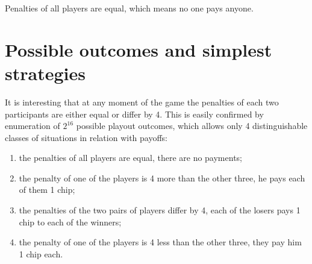 Penalties of all players are equal, which means no one pays anyone. %

\section{Possible outcomes and simplest strategies}\label{app:D3}

It is interesting that at any moment of the game the penalties of each two participants are either equal or differ by 4. This is easily confirmed by enumeration of $2^{16}$ possible playout outcomes, which allows only 4 distinguishable classes of situations in relation with payoffs: %
\begin{enumerate}
	\item the penalties of all players are equal, there are no payments; %
	\item the penalty of one of the players is 4 more than the other three, he pays each of them 1 chip; %
	\item the penalties of the two pairs of players differ by 4, each of the losers pays 1 chip to each of the winners; %
	\item the penalty of one of the players is 4 less than the other three, they pay him 1 chip each. %
\end{enumerate}

